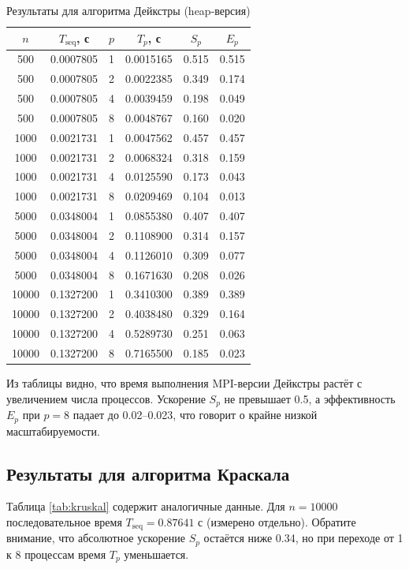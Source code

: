 \documentclass[14pt,a4paper]{article}
\begin{document}
\begin{table}[H]
\centering
\caption{Результаты для алгоритма Дейкстры (heap-версия)}
\label{tab:dijkstra}
\begin{tabular}{|c|c|c|c|c|c|}
\hline
$n$ & $T_{\text{seq}}$, с & $p$ & $T_p$, с & $S_p$ & $E_p$ \\
\hline
500 & 0.0007805 & 1 & 0.0015165 & 0.515 & 0.515 \\
500 & 0.0007805 & 2 & 0.0022385 & 0.349 & 0.174 \\
500 & 0.0007805 & 4 & 0.0039459 & 0.198 & 0.049 \\
500 & 0.0007805 & 8 & 0.0048767 & 0.160 & 0.020 \\
\hline
1000 & 0.0021731 & 1 & 0.0047562 & 0.457 & 0.457 \\
1000 & 0.0021731 & 2 & 0.0068324 & 0.318 & 0.159 \\
1000 & 0.0021731 & 4 & 0.0125590 & 0.173 & 0.043 \\
1000 & 0.0021731 & 8 & 0.0209469 & 0.104 & 0.013 \\
\hline
5000 & 0.0348004 & 1 & 0.0855380 & 0.407 & 0.407 \\
5000 & 0.0348004 & 2 & 0.1108900 & 0.314 & 0.157 \\
5000 & 0.0348004 & 4 & 0.1126010 & 0.309 & 0.077 \\
5000 & 0.0348004 & 8 & 0.1671630 & 0.208 & 0.026 \\
\hline
10000 & 0.1327200 & 1 & 0.3410300 & 0.389 & 0.389 \\
10000 & 0.1327200 & 2 & 0.4038480 & 0.329 & 0.164 \\
10000 & 0.1327200 & 4 & 0.5289730 & 0.251 & 0.063 \\
10000 & 0.1327200 & 8 & 0.7165500 & 0.185 & 0.023 \\
\hline
\end{tabular}
\end{table}

Из таблицы видно, что время выполнения MPI-версии Дейкстры растёт с увеличением числа процессов. Ускорение $S_p$ не превышает 0.5, а эффективность $E_p$ при $p=8$ падает до 0.02–0.023, что говорит о крайне низкой масштабируемости.

\subsection{Результаты для алгоритма Краскала}
Таблица \ref{tab:kruskal} содержит аналогичные данные. Для $n=10000$ последовательное время $T_{\text{seq}}=0.87641$ с (измерено отдельно). Обратите внимание, что абсолютное ускорение $S_p$ остаётся ниже 0.34, но при переходе от 1 к 8 процессам время $T_p$ уменьшается.
\end{document}
